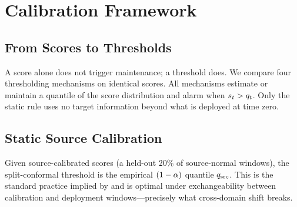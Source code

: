 \section{Calibration Framework}
\label{sec:method}

\subsection{From Scores to Thresholds}
A score alone does not trigger maintenance; a threshold does. We compare four thresholding mechanisms on identical scores. All mechanisms estimate or maintain a quantile of the score distribution and alarm when $s_t>q_t$. Only the static rule uses no target information beyond what is deployed at time zero.

\subsection{Static Source Calibration}
Given source-calibrated scores (a held-out 20\% of source-normal windows), the split-conformal threshold is the empirical $(1-\alpha)$ quantile $q_{\mathrm{src}}$. This is the standard practice implied by \cite{lei2018} and is optimal under exchangeability between calibration and deployment windows---precisely what cross-domain shift breaks.

